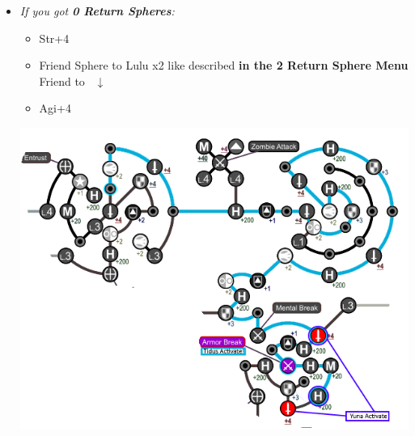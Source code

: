 \begin{spheregrid}
\begin{multicols}{2}
\begin{itemize}
\begin{itemize}
                \columnbreak
                \item \textit{If you got \textbf{0 Return Spheres}:}
                    \begin{itemize}
                        \kimahrif Move $\swarrow x2$
                        \yunaf Friend Sphere to \tidus
                        \item Str+4
                        \item Friend Sphere to Lulu x2 like described \textbf{in the 2 Return Sphere Menu}
                        \yunaf Friend to \kimahri\ $\downarrow$
                        \item Agi+4
                    \end{itemize}
                    \includegraphics[width=.9\columnwidth]{graphics/post_BY_0_returns}

\end{itemize}
\end{itemize}
\end{multicols}
\end{spheregrid}
